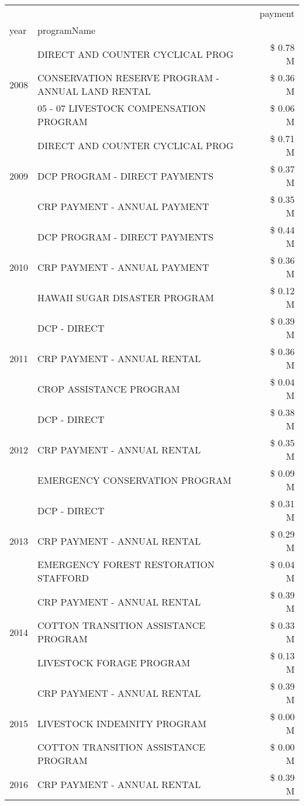 \begin{tabular}{llr}
\toprule
 &  & payment \\
year & programName &  \\
\midrule
\multirow[t]{3}{*}{2008} & DIRECT AND COUNTER CYCLICAL PROG & \$ 0.78 M \\
 & CONSERVATION RESERVE PROGRAM - ANNUAL LAND RENTAL & \$ 0.36 M \\
 & 05 - 07 LIVESTOCK COMPENSATION PROGRAM & \$ 0.06 M \\
\cline{1-3}
\multirow[t]{3}{*}{2009} & DIRECT AND COUNTER CYCLICAL PROG & \$ 0.71 M \\
 & DCP PROGRAM - DIRECT PAYMENTS & \$ 0.37 M \\
 & CRP PAYMENT - ANNUAL PAYMENT & \$ 0.35 M \\
\cline{1-3}
\multirow[t]{3}{*}{2010} & DCP PROGRAM - DIRECT PAYMENTS & \$ 0.44 M \\
 & CRP PAYMENT - ANNUAL PAYMENT & \$ 0.36 M \\
 & HAWAII SUGAR DISASTER PROGRAM & \$ 0.12 M \\
\cline{1-3}
\multirow[t]{3}{*}{2011} & DCP - DIRECT & \$ 0.39 M \\
 & CRP PAYMENT - ANNUAL RENTAL & \$ 0.36 M \\
 & CROP ASSISTANCE PROGRAM & \$ 0.04 M \\
\cline{1-3}
\multirow[t]{3}{*}{2012} & DCP - DIRECT & \$ 0.38 M \\
 & CRP PAYMENT - ANNUAL RENTAL & \$ 0.35 M \\
 & EMERGENCY CONSERVATION PROGRAM & \$ 0.09 M \\
\cline{1-3}
\multirow[t]{3}{*}{2013} & DCP - DIRECT & \$ 0.31 M \\
 & CRP PAYMENT - ANNUAL RENTAL & \$ 0.29 M \\
 & EMERGENCY FOREST RESTORATION STAFFORD & \$ 0.04 M \\
\cline{1-3}
\multirow[t]{3}{*}{2014} & CRP PAYMENT - ANNUAL RENTAL & \$ 0.39 M \\
 & COTTON TRANSITION ASSISTANCE PROGRAM & \$ 0.33 M \\
 & LIVESTOCK FORAGE PROGRAM & \$ 0.13 M \\
\cline{1-3}
\multirow[t]{3}{*}{2015} & CRP PAYMENT - ANNUAL RENTAL & \$ 0.39 M \\
 & LIVESTOCK INDEMNITY PROGRAM & \$ 0.00 M \\
 & COTTON TRANSITION ASSISTANCE PROGRAM & \$ 0.00 M \\
\cline{1-3}
\multirow[t]{3}{*}{2016} & CRP PAYMENT - ANNUAL RENTAL & \$ 0.39 M \\

\end{tabular}
